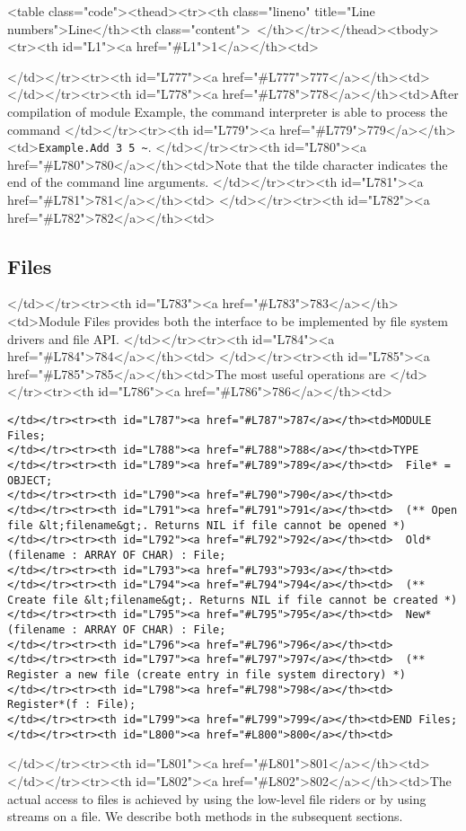 <table class="code"><thead><tr><th class="lineno" title="Line numbers">Line</th><th class="content"> </th></tr></thead><tbody><tr><th id="L1"><a href="#L1">1</a></th><td>\documentclass[a4paper,11pt]{article}
\begin{document}
</td></tr><tr><th id="L777"><a href="#L777">777</a></th><td>
</td></tr><tr><th id="L778"><a href="#L778">778</a></th><td>After compilation of module Example, the command interpreter is able to process the command
</td></tr><tr><th id="L779"><a href="#L779">779</a></th><td>\verb+Example.Add 3 5 ~+.
</td></tr><tr><th id="L780"><a href="#L780">780</a></th><td>Note that the tilde character indicates the end of the command line arguments.
</td></tr><tr><th id="L781"><a href="#L781">781</a></th><td>
</td></tr><tr><th id="L782"><a href="#L782">782</a></th><td>\subsection{Files}
</td></tr><tr><th id="L783"><a href="#L783">783</a></th><td>Module Files provides both the interface to be implemented by file system drivers and \AZ file API.
</td></tr><tr><th id="L784"><a href="#L784">784</a></th><td>
</td></tr><tr><th id="L785"><a href="#L785">785</a></th><td>The most useful operations are
</td></tr><tr><th id="L786"><a href="#L786">786</a></th><td>\begin{lstlisting}[language=Oberon,frame=none,caption={Basic Files API}]
</td></tr><tr><th id="L787"><a href="#L787">787</a></th><td>MODULE Files;
</td></tr><tr><th id="L788"><a href="#L788">788</a></th><td>TYPE
</td></tr><tr><th id="L789"><a href="#L789">789</a></th><td>  File* = OBJECT;
</td></tr><tr><th id="L790"><a href="#L790">790</a></th><td>
</td></tr><tr><th id="L791"><a href="#L791">791</a></th><td>  (** Open file &lt;filename&gt;. Returns NIL if file cannot be opened *)
</td></tr><tr><th id="L792"><a href="#L792">792</a></th><td>  Old*(filename : ARRAY OF CHAR) : File;
</td></tr><tr><th id="L793"><a href="#L793">793</a></th><td>
</td></tr><tr><th id="L794"><a href="#L794">794</a></th><td>  (** Create file &lt;filename&gt;. Returns NIL if file cannot be created *)
</td></tr><tr><th id="L795"><a href="#L795">795</a></th><td>  New*(filename : ARRAY OF CHAR) : File;
</td></tr><tr><th id="L796"><a href="#L796">796</a></th><td>
</td></tr><tr><th id="L797"><a href="#L797">797</a></th><td>  (** Register a new file (create entry in file system directory) *)
</td></tr><tr><th id="L798"><a href="#L798">798</a></th><td>  Register*(f : File);
</td></tr><tr><th id="L799"><a href="#L799">799</a></th><td>END Files;
</td></tr><tr><th id="L800"><a href="#L800">800</a></th><td>\end{lstlisting}
</td></tr><tr><th id="L801"><a href="#L801">801</a></th><td>
</td></tr><tr><th id="L802"><a href="#L802">802</a></th><td>The actual access to files is achieved by using the low-level file riders or by using streams on a file. We describe both methods in the subsequent sections.
\end{document}
